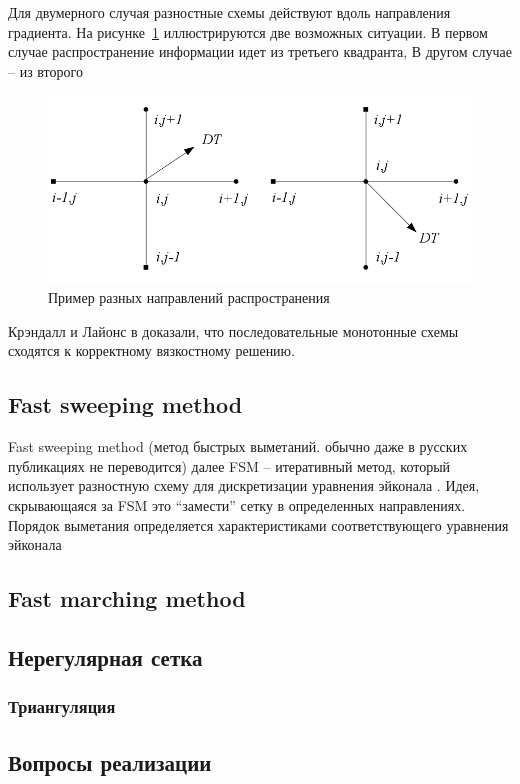 Для двумерного случая разностные схемы действуют вдоль направления
градиента. На рисунке~\ref{fig:upwind-schema} иллюстрируются две
возможных ситуации. В первом случае распространение информации идет из
третьего квадранта, В другом случае -- из второго


\begin{figure}[h]
  \centering
  \includegraphics[width=\linewidth]{img/upwind-schema.png}
  \hfil \caption{Пример разных направлений распространения}
  \label{fig:upwind-schema}

\end{figure}

Крэндалл и Лайонс в \cite{V1983} доказали, что последовательные
монотонные схемы сходятся к корректному вязкостному решению.

\subsection{Fast sweeping method}
\label{sec:fast-sweeping-method}

Fast sweeping method (метод быстрых выметаний. обычно даже в
русских публикациях не переводится) далее FSM -- итеративный метод, который
использует разностную схему для дискретизации уравнения эйконала
\cite{F2005}. Идея, скрывающаяся за FSM это ``замести'' сетку в
определенных направлениях. Порядок выметания определяется
характеристиками соответствующего уравнения эйконала

\subsection{Fast marching method}
\label{sec:fast-marching-method}


\subsection{Нерегулярная сетка}
\label{sec:unstructured-mesh}

\subsubsection{Триангуляция}
\label{sec:triangulate}

\subsection{Вопросы реализации}
\label{sec:programming}



